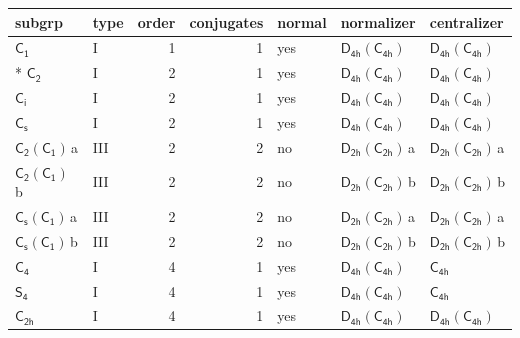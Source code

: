 \documentclass[10pt,a4paper]{article}
\numberwithin{equation}{section}
\newcommand{\grp}[1]{\mathsf{#1}}
\newcommand{\clsletter}[1]{\,{\scriptsize\color{black!55}#1}}
\begin{document}
{\small\begin{longtable}{@{}llrrlll@{}}\toprule
subgrp & type & order & conjugates & normal & normalizer & centralizer\\\midrule\endhead
\bottomrule\endfoot\endlastfoot
\href{../../../rotation/data/pdf/C1.pdf}{$\grp{C_{1}}$} & I & 1 & 1 & yes & \href{D4h-C4h.pdf}{$\grp{D_{4h}}(\grp{C_{4h}})$} & \href{D4h-C4h.pdf}{$\grp{D_{4h}}(\grp{C_{4h}})$}\\*
\href{../../../rotation/data/pdf/C2.pdf}{$\grp{C_{2}}$} & I & 2 & 1 & yes & \href{D4h-C4h.pdf}{$\grp{D_{4h}}(\grp{C_{4h}})$} & \href{D4h-C4h.pdf}{$\grp{D_{4h}}(\grp{C_{4h}})$}\\
\href{../../../rotation/data/pdf/S2.pdf}{$\grp{C_{i}}$} & I & 2 & 1 & yes & \href{D4h-C4h.pdf}{$\grp{D_{4h}}(\grp{C_{4h}})$} & \href{D4h-C4h.pdf}{$\grp{D_{4h}}(\grp{C_{4h}})$}\\
\href{../../../rotation/data/pdf/C1v.pdf}{$\grp{C_{s}}$} & I & 2 & 1 & yes & \href{D4h-C4h.pdf}{$\grp{D_{4h}}(\grp{C_{4h}})$} & \href{D4h-C4h.pdf}{$\grp{D_{4h}}(\grp{C_{4h}})$}\\
\href{C2-C1.pdf}{$\grp{C_{2}}(\grp{C_{1}})$}\clsletter{a} & III & 2 & 2 & no & \href{D2h-C2h.pdf}{$\grp{D_{2h}}(\grp{C_{2h}})$}\clsletter{a} & \href{D2h-C2h.pdf}{$\grp{D_{2h}}(\grp{C_{2h}})$}\clsletter{a}\\
\href{C2-C1.pdf}{$\grp{C_{2}}(\grp{C_{1}})$}\clsletter{b} & III & 2 & 2 & no & \href{D2h-C2h.pdf}{$\grp{D_{2h}}(\grp{C_{2h}})$}\clsletter{b} & \href{D2h-C2h.pdf}{$\grp{D_{2h}}(\grp{C_{2h}})$}\clsletter{b}\\
\href{C1v-C1.pdf}{$\grp{C_{s}}(\grp{C_{1}})$}\clsletter{a} & III & 2 & 2 & no & \href{D2h-C2h.pdf}{$\grp{D_{2h}}(\grp{C_{2h}})$}\clsletter{a} & \href{D2h-C2h.pdf}{$\grp{D_{2h}}(\grp{C_{2h}})$}\clsletter{a}\\
\href{C1v-C1.pdf}{$\grp{C_{s}}(\grp{C_{1}})$}\clsletter{b} & III & 2 & 2 & no & \href{D2h-C2h.pdf}{$\grp{D_{2h}}(\grp{C_{2h}})$}\clsletter{b} & \href{D2h-C2h.pdf}{$\grp{D_{2h}}(\grp{C_{2h}})$}\clsletter{b}\\
\href{../../../rotation/data/pdf/C4.pdf}{$\grp{C_{4}}$} & I & 4 & 1 & yes & \href{D4h-C4h.pdf}{$\grp{D_{4h}}(\grp{C_{4h}})$} & \href{../../../rotation/data/pdf/C4h.pdf}{$\grp{C_{4h}}$}\\
\href{../../../rotation/data/pdf/S4.pdf}{$\grp{S_{4}}$} & I & 4 & 1 & yes & \href{D4h-C4h.pdf}{$\grp{D_{4h}}(\grp{C_{4h}})$} & \href{../../../rotation/data/pdf/C4h.pdf}{$\grp{C_{4h}}$}\\
\href{../../../rotation/data/pdf/C2h.pdf}{$\grp{C_{2h}}$} & I & 4 & 1 & yes & \href{D4h-C4h.pdf}{$\grp{D_{4h}}(\grp{C_{4h}})$} & \href{D4h-C4h.pdf}{$\grp{D_{4h}}(\grp{C_{4h}})$}\\

\end{longtable}}
\end{document}
